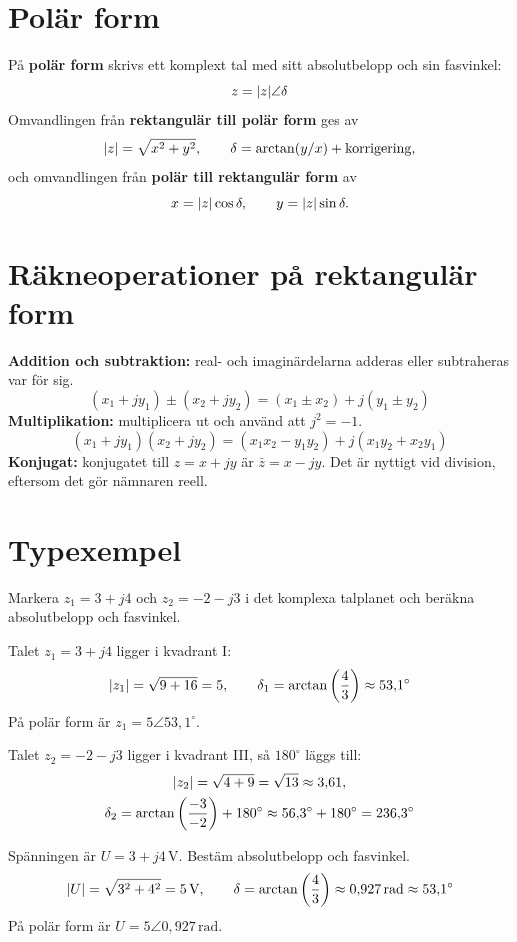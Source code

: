 \section{Polär form}
\label{c15:sec:polar}
På \textbf{polär form} skrivs ett komplext tal med sitt absolutbelopp och sin fasvinkel:
\[
  z = \lvert z\rvert\angle\delta
\]
Omvandlingen från \textbf{rektangulär till polär form} ges av
\[
  \lvert z\rvert = \sqrt{x^2 + y^2}, \qquad \delta = \arctan(y/x) + \text{korrigering},
\]
och omvandlingen från \textbf{polär till rektangulär form} av
\[
  x = \lvert z\rvert\cos\delta, \qquad y = \lvert z\rvert\sin\delta.
\]

\section{Räkneoperationer på rektangulär form}
\label{c15:sec:rakneoperationer}
\textbf{Addition och subtraktion:} real- och imaginärdelarna adderas eller subtraheras var
för sig.
\[
  (x_1 + jy_1) \pm (x_2 + jy_2) = (x_1 \pm x_2) + j(y_1 \pm y_2)
\]
\textbf{Multiplikation:} multiplicera ut och använd att $j^2 = -1$.
\[
  (x_1 + jy_1)(x_2 + jy_2) = (x_1x_2 - y_1y_2) + j(x_1y_2 + x_2y_1)
\]
\textbf{Konjugat:} konjugatet till $z = x + jy$ är $\bar{z} = x - jy$. Det är nyttigt vid
division, eftersom det gör nämnaren reell.

\section{Typexempel}
\label{c15:sec:typexempel}

\begin{exempel}
Markera $z_1 = 3 + j4$ och $z_2 = -2 - j3$ i det komplexa talplanet och beräkna absolutbelopp och
fasvinkel.

Talet $z_1 = 3 + j4$ ligger i kvadrant I:
\[
  \lvert z_1\rvert = \sqrt{9 + 16} = 5, \qquad
  \delta_1 = \arctan\left(\frac{4}{3}\right) \approx 53{,}1^{\circ}
\]
På polär form är $z_1 = 5\angle 53{,}1^{\circ}$.

Talet $z_2 = -2 - j3$ ligger i kvadrant III, så $180^{\circ}$ läggs till:
\begin{gather*}
  \lvert z_2\rvert = \sqrt{4 + 9} = \sqrt{13} \approx 3{,}61, \\
  \delta_2 = \arctan\left(\frac{-3}{-2}\right) + 180^{\circ} \approx 56{,}3^{\circ} + 180^{\circ}
    = 236{,}3^{\circ}
\end{gather*}
\end{exempel}

\begin{exempel}
Spänningen är $U = 3 + j4\,\text{V}$. Bestäm absolutbelopp och fasvinkel.
\[
  \lvert U\rvert = \sqrt{3^2 + 4^2} = 5\,\text{V}, \qquad
  \delta = \arctan\left(\frac{4}{3}\right) \approx 0{,}927\,\text{rad} \approx 53{,}1^{\circ}
\]
På polär form är $U = 5\angle 0{,}927\,\text{rad}$.
\end{exempel}

